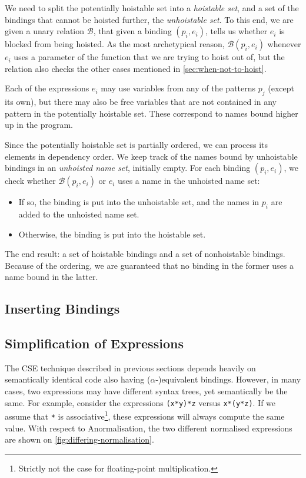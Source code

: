 We need to split the potentially hoistable set into a
\textit{hoistable set}, and a set of the bindings that cannot be
hoisted further, the \textit{unhoistable set}.  To this end, we are
given a unary relation $\mathcal{B}$, that given a binding $(p_{i},
e_{i})$, tells us whether $e_{i}$ is blocked from being hoisted.  As
the most archetypical reason, $\mathcal{B}(p_{i}, e_{i})$ whenever
$e_{i}$ uses a parameter of the function that we are trying to hoist
out of, but the relation also checks the other cases mentioned in
\cref{sec:when-not-to-hoist}.

Each of the expressions $e_{i}$ may use variables from any of the
patterns $p_{j}$ (except its own), but there may also be free
variables that are not contained in any pattern in the potentially
hoistable set.  These correspond to names bound higher up in the
program.

Since the potentially hoistable set is partially ordered, we can
process its elements in dependency order.  We keep track of the names
bound by unhoistable bindings in an \textit{unhoisted name set},
initially empty.  For each binding $(p_{i},e_{i})$, we check whether
$\mathcal{B}(p_{i},e_{i})$ or $e_{i}$ uses a name in the unhoisted
name set:
\begin{itemize}
\item If so, the binding is put into the unhoistable set, and the
  names in $p_{i}$ are added to the unhoisted name set.
\item Otherwise, the binding is put into the hoistable set.
\end{itemize}
The end result: a set of hoistable bindings and a set of nonhoistable
bindings.  Because of the ordering, we are guaranteed that no binding
in the former uses a name bound in the latter.

\subsection{Inserting Bindings}


\subsection{Simplification of Expressions}
\label{sec:simplification-of-expressions}

The CSE technique described in previous sections depends heavily on
semantically identical code also having ($\alpha$-)equivalent
bindings.  However, in many cases, two expressions may have different
syntax trees, yet semantically be the same.  For example, consider the
expressions \texttt{(x*y)*z} versus \texttt{x*(y*z)}.  If we assume
that \texttt{*} is associative\footnote{Strictly not the case for
  floating-point multiplication.}, these expressions will always
compute the same value.  With respect to Anormalisation, the two
different normalised expressions are shown on
\cref{fig:differing-normalisation}.

